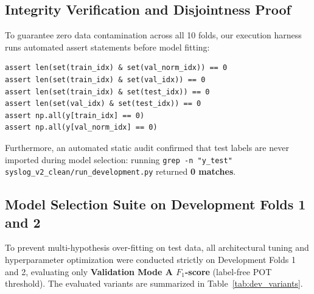 \subsection{Integrity Verification and Disjointness Proof}
To guarantee zero data contamination across all 10 folds, our execution harness runs automated assert statements before model fitting:
\begin{verbatim}
assert len(set(train_idx) & set(val_norm_idx)) == 0
assert len(set(train_idx) & set(val_idx)) == 0
assert len(set(train_idx) & set(test_idx)) == 0
assert len(set(val_idx) & set(test_idx)) == 0
assert np.all(y[train_idx] == 0)
assert np.all(y[val_norm_idx] == 0)
\end{verbatim}
Furthermore, an automated static audit confirmed that test labels are never imported during model selection: running \texttt{grep -n "y\_test" syslog\_v2\_clean/run\_development.py} returned \textbf{0 matches}.

\subsection{Model Selection Suite on Development Folds 1 and 2}
\label{subsec:dev_selection}
To prevent multi-hypothesis over-fitting on test data, all architectural tuning and hyperparameter optimization were conducted strictly on Development Folds 1 and 2, evaluating only \textbf{Validation Mode A $F_1$-score} (label-free POT threshold). The evaluated variants are summarized in Table~\ref{tab:dev_variants}.

